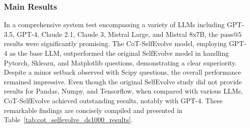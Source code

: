 \documentclass[a4paper,oneside]{book}
\begin{document}
\subsubsection{Main Results}
In a comprehensive system test encompassing a variety of LLMs including GPT-3.5, GPT-4, Claude 2.1, Claude 3, Mistral Large, and Mistral 8x7B, the $\text{pass@5}$ results were significantly promising. The CoT-SelfEvolve model, employing GPT-4 as the base LLM, outperformed the original SelfEvolve model in handling Pytorch, Sklearn, and Matplotlib questions, demonstrating a clear superiority. Despite a minor setback observed with Scipy questions, the overall performance remained impressive. Even though the original SelfEvolve study did not provide results for Pandas, Numpy, and Tensorflow, when compared with various LLMs, CoT-SelfEvolve achieved outstanding results, notably with GPT-4. These remarkable findings are concisely compiled and presented in Table~\ref{tab:cot_selfevolve_ds1000_results}.
\end{document}
